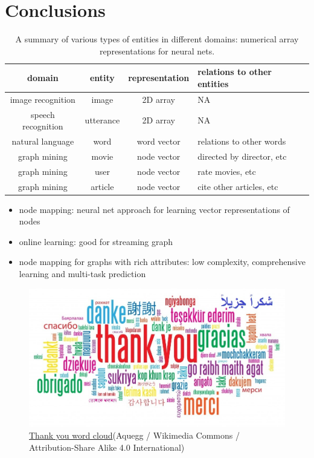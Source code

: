 \documentclass{article}
\begin{document}
\section{Conclusions}
\begin{table}[H]
	\centering
	\begin{tabularx}{\textwidth}{ |c|c|c|X| }
		\hline domain & entity & representation & relations to other entities 
		\\ 
		\hline image recognition & image & 2D array & NA \\ 
		\hline speech recognition & utterance & 2D array & NA \\ 
		\hline natural language & word & word vector & relations to other words 
		\\ 
		\hline graph mining & movie & node vector & directed by director, etc 
		\\ 
		\hline graph mining & user & node vector & rate movies, etc \\ 
		\hline graph mining & article & node vector & cite other articles, etc 
		\\
		\hline
	\end{tabularx}
	\caption{A summary of various types of entities in different domains: 
	numerical array representations for neural nets.}
	\label{tab:domains}
\end{table}
\begin{itemize}
	\item node mapping: neural net approach for learning vector 
	representations of nodes
	\item online learning: good for streaming graph
	\item node mapping for graphs with rich attributes: low complexity, 
	comprehensive learning and multi-task prediction
\end{itemize}
\begin{figure}[H]
	\centering
	\includegraphics[width=\linewidth]{Thank-you-word-cloud}
	\caption{ 
	\href{https://commons.wikimedia.org/wiki/File:Spectrogram-19thC.png}{Thank 
	you word cloud}(Aquegg / Wikimedia Commons / Attribution-Share Alike 4.0 
	International)}
	\label{fig:Thank-you-word-cloud}
\end{figure}



\end{document}
